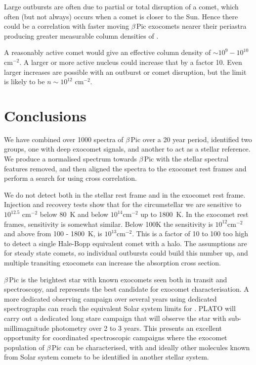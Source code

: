 \documentclass{aa}
\newcommand{\bp}{$\beta$\,Pic}
\begin{document}
Large outbursts are often due to partial or total disruption of a comet, which often (but not always) occurs when a comet is closer to the Sun.
%
Hence there could be a correlation with faster moving \bp{} exocomets nearer their periastra producing greater measurable column densities of .

A reasonably active comet would give an effective  column density of $\sim 10^{9}-10^{10}$ cm$^{-2}$.
%
A larger or more active nucleus could increase that by a factor 10.
%
Even larger increases are possible with an outburst or comet disruption, but the limit is likely to be  $n\sim10^{12}$ cm$^{-2}$.


\section{Conclusions}\label{sec:conclusion}

We have combined over 1000 spectra of \bp{} over a 20 year period, identified two groups, one with deep exocomet signals, and another to act as a stellar reference.
%
We produce a normalised spectrum towards \bp{} with the stellar spectral features removed, and then aligned the spectra to the exocomet rest frames and perform a search for  using cross correlation.

We do not detect  both in the stellar rest frame and in the exocomet rest frame.
%
Injection and recovery tests show that for the circumstellar  we are sensitive to $10^{12.5}$ cm$^{-2}$ below 80~K and below $10^{14}$cm$^{-2}$ up to 1800~K.
%
In the exocomet rest frames, sensitivity is somewhat similar.
%
Below 100K the sensitivity is $10^{12}$cm$^{-2}$ and above from 100 - 1800~K, is $10^{13}$cm$^{-2}$.
%
This is a factor of 10 to 100 too high to detect a single Hale-Bopp equivalent comet with a  halo.
%
%
%
The assumptions are for steady state comets, so individual outbursts could build this number up, and multiple transiting exocomets can increase the absorption cross section.

\bp{} is the brightest star with known exocomets seen both in transit and spectroscopy, and represents the best candidate for exocomet characterisation.
%
A more dedicated observing campaign over several years using dedicated spectrographs can reach the equivalent Solar system limits for .
%
PLATO will carry out a dedicated long stare campaign that will observe the star with sub-millimagnitude photometry over 2 to 3 years.
%
This presents an excellent opportunity for coordinated spectroscopic campaigns where the exocomet population of \bp{} can be characterised, with  and ideally other molecules known from Solar system comets to be identified in another stellar system.
\end{document}
